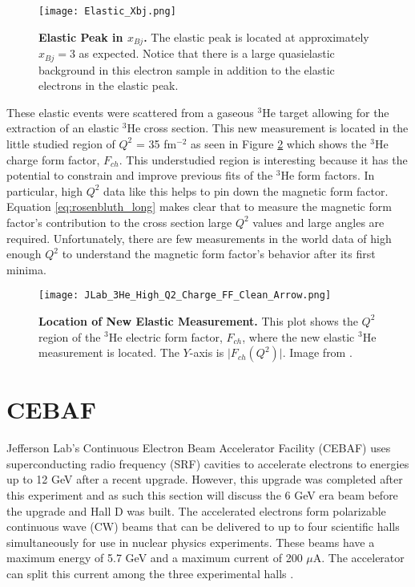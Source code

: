 \begin{figure}[!ht]
\begin{center}
\texttt{[image: Elastic\_Xbj.png]}
\end{center}
\caption[Elastic Peak in $x_{Bj}$]{
{\bf{Elastic Peak in $x_{Bj}$.}} The elastic peak is located at approximately $x_{Bj}=3$ as expected. Notice that there is a large quasielastic background in this electron sample in addition to the elastic electrons in the elastic peak.}
\label{fig:elastic_xbj}
\end{figure}

These elastic events were scattered from a gaseous $^3$He target allowing for the extraction of an elastic $^3$He cross section. This new measurement is located in the little studied region of $Q^2$ = 35 fm$^{-2}$ as seen in Figure \ref{fig:jlab_3he} which shows the $^3$He charge form factor, $F_{ch}$. This understudied region is interesting because it has the potential to constrain and improve previous fits of the $^3$He form factors. In particular, high $Q^2$ data like this helps to pin down the magnetic form factor. Equation \ref{eq:rosenbluth_long} makes clear that to measure the magnetic form factor's contribution to the cross section large $Q^2$ values and large angles are required. Unfortunately, there are few measurements in the world data of high enough $Q^2$ to understand the magnetic form factor's behavior after its first minima. 

\begin{figure}[!ht]
\begin{center}
\texttt{[image: JLab\_3He\_High\_Q2\_Charge\_FF\_Clean\_Arrow.png]}
\end{center}
\caption[Location of New Elastic Measurement]{
{\bf{Location of New Elastic Measurement.}} This plot shows the $Q^2$ region of the $^3$He electric form factor, $F_{ch}$, where the new elastic $^3$He measurement is located. The $Y$-axis is $\lvert {F_{ch}(Q^2)} \rvert$. Image from \cite{Article:Alex}.}
\label{fig:jlab_3he}
\end{figure}

\section{CEBAF}
\label{sec:CEBAF}

Jefferson Lab's Continuous Electron Beam Accelerator Facility (CEBAF) uses superconducting radio frequency (SRF) cavities to accelerate electrons to energies up to 12 GeV after a recent upgrade. However, this upgrade was completed after this experiment and as such this section will discuss the 6 GeV era beam before the upgrade and Hall D was built. The accelerated electrons form polarizable continuous wave (CW) beams that can be delivered to up to four scientific halls simultaneously for use in nuclear physics experiments. These beams have a maximum energy of 5.7 GeV and a maximum current of 200 $\mu$A. The accelerator can split this current among the three experimental halls \cite{Article:CEBAF}.

